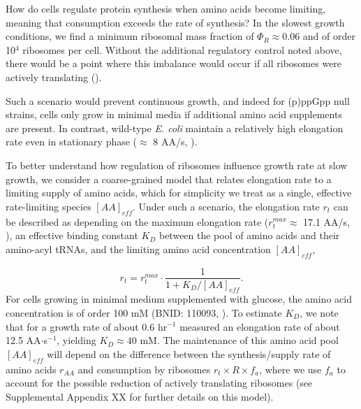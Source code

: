 How do cells regulate protein synthesis when amino acids become limiting,
meaning that consumption exceeds the rate of synthesis? In the slowest  growth
conditions, we find a minimum ribosomal mass fraction of $\Phi_R \approx 0.06$
and  of order 10$^4$ ribosomes per cell.  Without the additional regulatory
control noted above, there would be a point where  this imbalance would occur if
all ribosomes were actively translating  ().

Such a
scenario would prevent continuous growth, and indeed for (p)ppGpp null strains,
cells only grow in minimal media if additional amino acid supplements are
present. In contrast, wild-type \textit{E. coli} maintain a relatively high
elongation rate even in stationary phase ($\approx$ 8 AA/s, \citep{dai2016,
dai2018}).

To better understand how regulation of ribosomes influence growth rate at
slow growth, we consider a coarse-grained model that relates elongation
rate to a limiting supply of amino acids, which for simplicity we treat as a
single, effective rate-limiting species $[AA]_{eff}$. Under such a scenario, the elongation
rate $r_t$ can be described as depending on the maximum elongation rate ($r_t^{max}
\approx$ 17.1 AA/s, \citep{dai2016, dai2018}), an effective binding constant
$K_D$ between the pool of amino acids and their amino-acyl tRNAs, and the limiting
amino acid concentration $[AA]_{eff}$,

\begin{equation}
r_t = r_t^{max} \cdot \frac{1}{1 + K_D / [AA]_{eff}}.
\label{eq:rate_Kd}
\end{equation}
For cells growing in minimal medium supplemented with glucose, the amino acid
concentration is of order 100 mM (BNID: 110093, \citep{milo2010, bennett2009}).
To estimate  $K_D$, we note that for a growth rate of about 0.6 hr$^{-1}$
\cite{dai2016} measured an elongation rate of about 12.5 AA$\cdot$s$^{-1}$,
yielding $K_D \approx 40$ mM. The maintenance of this amino acid pool
$[AA]_{eff}$ will depend on the difference between the synthesis/supply rate of
amino acids $r_{AA}$ and consumption by ribosomes $r_t \times R \times f_a$,
where we use $f_a$ to account for the possible reduction of actively translating
ribosomes (see Supplemental Appendix XX for further details on this model).

